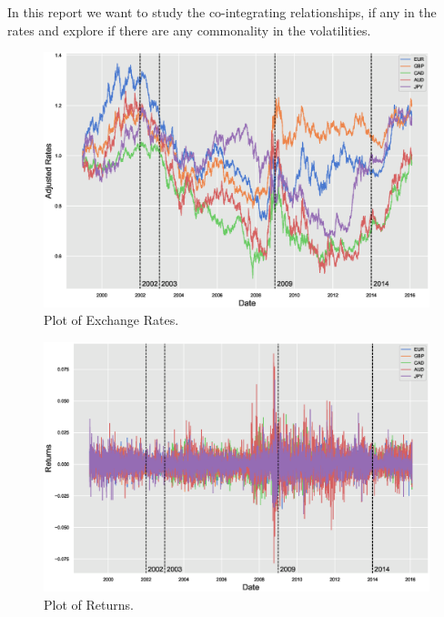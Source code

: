 In this report we want to study the co-integrating relationships, if any in the rates and explore if there are any commonality in the volatilities.

	\begin{figure}[!ht]
	\centering
	\includegraphics[width=\textwidth]{chapters/chapter_mvts/figures/pexchrate.eps}
	\caption{Plot of Exchange Rates. \label{fig:pexchrate}}
	\end{figure}
	
	\begin{figure}[!ht]
	\centering
	\includegraphics[width=\textwidth]{chapters/chapter_mvts/figures/preturns.eps}
	\caption{Plot of Returns. \label{fig:preturns}}
	\end{figure}
	
